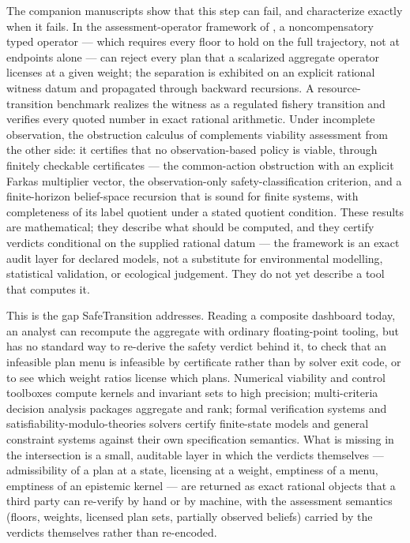 \documentclass[11pt]{article}
\begin{document}
The companion manuscripts show that this step can fail, and characterize
exactly when it fails. In the assessment-operator framework of \citet{Abaee2026a},
a noncompensatory typed operator --- which requires every floor to hold on
the full trajectory, not at endpoints alone --- can reject every plan that a
scalarized aggregate operator licenses at a given weight; the separation is
exhibited on an explicit rational witness datum and propagated through
backward recursions. A resource-transition benchmark realizes the witness as
a regulated fishery transition and verifies every quoted number in exact
rational arithmetic. Under incomplete observation, the obstruction calculus
of \citet{Abaee2026b} complements viability assessment from the other side: it
certifies that no observation-based policy is viable, through finitely
checkable certificates --- the common-action obstruction with an explicit
Farkas multiplier vector, the observation-only safety-classification
criterion, and a finite-horizon belief-space recursion that is sound for
finite systems, with completeness of its label quotient under a stated
quotient condition. These results are mathematical; they describe what
should be computed, and they certify verdicts conditional on the supplied
rational datum --- the framework is an exact audit layer for declared
models, not a substitute for environmental modelling, statistical
validation, or ecological judgement. They do not yet describe a tool
that computes it.

This is the gap SafeTransition addresses. Reading a composite dashboard
today, an analyst can recompute the aggregate with ordinary floating-point
tooling, but has no standard way to re-derive the safety verdict behind it,
to check that an infeasible plan menu is infeasible by certificate rather
than by solver exit code, or to see which weight ratios license which plans.
Numerical viability and control toolboxes compute kernels and invariant sets
to high precision; multi-criteria decision analysis packages aggregate and
rank; formal verification systems and satisfiability-modulo-theories solvers
certify finite-state models and general constraint systems against their own
specification semantics. What is missing in the intersection is a small,
auditable layer in which the verdicts themselves --- admissibility of a plan
at a state, licensing at a weight, emptiness of a menu, emptiness of an
epistemic kernel --- are returned as exact rational objects that a third
party can re-verify by hand or by machine, with the assessment semantics
(floors, weights, licensed plan sets, partially observed beliefs) carried by
the verdicts themselves rather than re-encoded.
\end{document}
